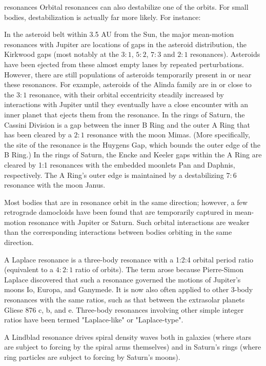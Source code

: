 \begin{frame}[allowframebreaks]{resonances}
Orbital resonances can also destabilize one of the orbits. For small bodies, destabilization is actually far more likely. For instance:

    In the asteroid belt within 3.5 AU from the Sun, the major mean-motion resonances with Jupiter are locations of gaps in the asteroid distribution, the Kirkwood gaps (most notably at the $3:1$, $5:2$, $7:3$ and $2:1$ resonances). Asteroids have been ejected from these almost empty lanes by repeated perturbations. However, there are still populations of asteroids temporarily present in or near these resonances. For example, asteroids of the Alinda family are in or close to the $3:1$ resonance, with their orbital eccentricity steadily increased by interactions with Jupiter until they eventually have a close encounter with an inner planet that ejects them from the resonance.
    In the rings of Saturn, the Cassini Division is a gap between the inner B Ring and the outer A Ring that has been cleared by a $2:1$ resonance with the moon Mimas. (More specifically, the site of the resonance is the Huygens Gap, which bounds the outer edge of the B Ring.)
    In the rings of Saturn, the Encke and Keeler gaps within the A Ring are cleared by 1:1 resonances with the embedded moonlets Pan and Daphnis, respectively. The A Ring's outer edge is maintained by a destabilizing $7:6$ resonance with the moon Janus.

Most bodies that are in resonance orbit in the same direction; however, a few retrograde damocloids have been found that are temporarily captured in mean-motion resonance with Jupiter or Saturn. Such orbital interactions are weaker than the corresponding interactions between bodies orbiting in the same direction.

A Laplace resonance is a three-body resonance with a 1:2:4 orbital period ratio (equivalent to a $4:2:1$ ratio of orbits). The term arose because Pierre-Simon Laplace discovered that such a resonance governed the motions of Jupiter's moons Io, Europa, and Ganymede. It is now also often applied to other 3-body resonances with the same ratios, such as that between the extrasolar planets Gliese 876 c, b, and e. Three-body resonances involving other simple integer ratios have been termed "Laplace-like" or "Laplace-type".

A Lindblad resonance drives spiral density waves both in galaxies (where stars are subject to forcing by the spiral arms themselves) and in Saturn's rings (where ring particles are subject to forcing by Saturn's moons).


\end{frame}
